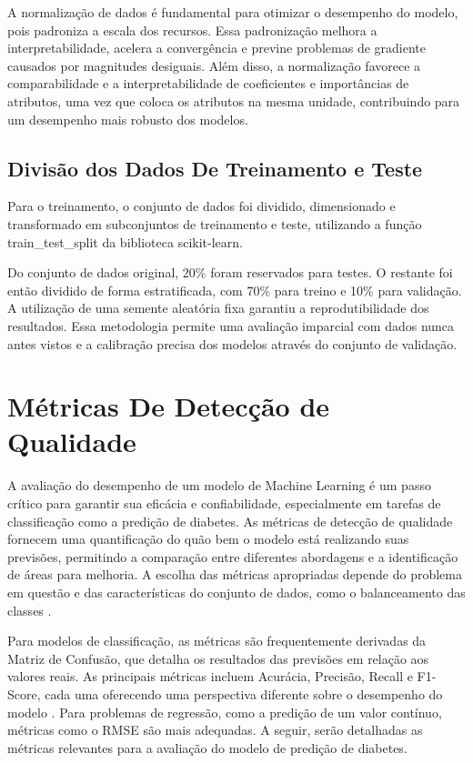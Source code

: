 A normalização de dados é fundamental para otimizar o desempenho do modelo, pois padroniza a escala dos recursos. Essa padronização melhora a interpretabilidade, acelera a convergência e previne problemas de gradiente causados por magnitudes desiguais. Além disso, a normalização favorece a comparabilidade e a interpretabilidade de coeficientes e importâncias de atributos, uma vez que coloca os atributos na mesma unidade, contribuindo para um desempenho mais robusto dos modelos.

\subsection{Divisão dos Dados De Treinamento e Teste}
Para o treinamento, o conjunto de dados foi dividido, dimensionado e transformado em subconjuntos de treinamento e teste, utilizando a função train\_test\_split da biblioteca scikit-learn.

Do conjunto de dados original, 20\% foram reservados para testes. O restante foi então dividido de forma estratificada, com 70\% para treino e 10\% para validação. A utilização de uma semente aleatória fixa garantiu a reprodutibilidade dos resultados. Essa metodologia permite uma avaliação imparcial com dados nunca antes vistos e a calibração precisa dos modelos através do conjunto de validação. 


\section{Métricas De Detecção de Qualidade}
A avaliação do desempenho de um modelo de Machine Learning é um passo crítico para garantir sua eficácia e confiabilidade, especialmente em tarefas de classificação como a predição de diabetes. As métricas de detecção de qualidade fornecem uma quantificação do quão bem o modelo está realizando suas previsões, permitindo a comparação entre diferentes abordagens e a identificação de áreas para melhoria. A escolha das métricas apropriadas depende do problema em questão e das características do conjunto de dados, como o balanceamento das classes \cite{Han2012, Bishop2006}.

Para modelos de classificação, as métricas são frequentemente derivadas da Matriz de Confusão, que detalha os resultados das previsões em relação aos valores reais. As principais métricas incluem Acurácia, Precisão, Recall e F1-Score, cada uma oferecendo uma perspectiva diferente sobre o desempenho do modelo \cite{Freitas2024}. Para problemas de regressão, como a predição de um valor contínuo, métricas como o RMSE são mais adequadas. A seguir, serão detalhadas as métricas relevantes para a avaliação do modelo de predição de diabetes.

